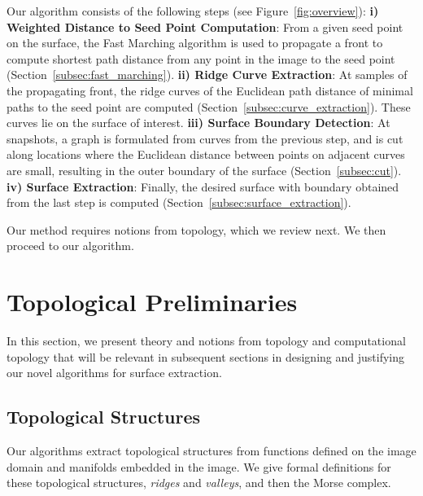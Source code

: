 \documentclass[10pt,journal,compsoc]{IEEEtran}
\begin{document}
Our algorithm consists of the following steps (see
Figure~\ref{fig:overview}): {\bf i) Weighted Distance to Seed Point
  Computation}: From a given seed point on the surface, the Fast
Marching algorithm is used to propagate a front to compute shortest
path distance from any point in the image to the seed point
(Section~\ref{subsec:fast_marching}). {\bf ii) Ridge Curve
  Extraction}: At samples of the propagating front, the ridge curves
of the Euclidean path distance of minimal paths to the seed point are
computed (Section~\ref{subsec:curve_extraction}). These curves lie on
the surface of interest. {\bf iii) Surface Boundary Detection}: At
snapshots, a graph is formulated from curves from the previous step,
and is cut along locations where the Euclidean distance between points
on adjacent curves are small, resulting in the outer boundary of the
surface (Section~\ref{subsec:cut}). {\bf iv) Surface Extraction}:
Finally, the desired surface with boundary obtained from the last step
is computed (Section~\ref{subsec:surface_extraction}).

Our method requires notions from topology, which we review next. We
then proceed to our algorithm.


\section{Topological Preliminaries}

In this section, we present theory and notions from topology and
computational topology that will be relevant in subsequent sections in
designing and justifying our novel algorithms for surface extraction.


\subsection{Topological Structures}

Our algorithms extract topological structures from functions defined
on the image domain and manifolds embedded in the image. We give
formal definitions for these topological structures, \emph{ridges} and
\emph{valleys}, and then the Morse complex.
\end{document}

